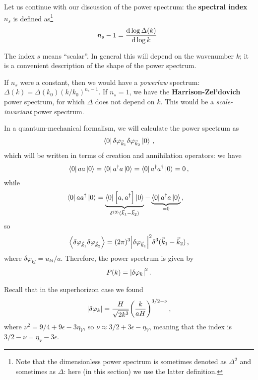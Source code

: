 \documentclass[main.tex]{subfiles}
\begin{document}
Let us continue with our discussion of the power spectrum: the \textbf{spectral index} \(n_s\) is defined as\footnote{Note that the dimensionless power spectrum is sometimes denoted as \(\Delta^2\) and sometimes as \(\Delta \): here (in this section) we use the latter definition.}
%
\begin{align}
n_s - 1 = \dv{\log \Delta (k)}{\log k}
\,.
\end{align}

The index \(s\) means ``scalar''. 
In general this will depend on the wavenumber \(k\); it is a convenient description of the shape of the power spectrum. 

If \(n_s\) were a constant, then we would have a \emph{powerlaw} spectrum: \(\Delta (k) = \Delta (k_0 ) (k / k_0 )^{n_s - 1}\). 
If \(n_s = 1\), we have the \textbf{Harrison-Zel'dovich} power spectrum, for which \(\Delta \) does not depend on \(k\).
This would be a \emph{scale-invariant} power spectrum.

In a quantum-mechanical formalism, we will calculate the power spectrum as 
%
\begin{align}
\bra{0} \delta \varphi _{\vec{k}_1} \delta \varphi _{\vec{k}_2} \ket{0}
\,,
\end{align}
%
which will be written in terms of creation and annihilation operators: we have 
%
\begin{align}
\bra{0} a a \ket{0}=
\bra{0} a ^\dag a  \ket{0}=
\bra{0} a ^\dag a ^\dag \ket{0}= 0
\,,
\end{align}
%
while 
%
\begin{align}
\bra{0} a a ^\dag \ket{0} &= \underbrace{\bra{0} \qty[a, a ^\dag] \ket{0}}_{ \delta^{(3)} (\vec{k}_1 - \vec{k}_2)} - \underbrace{\bra{0} a ^\dag a \ket{0}}_{= 0} 
\,,
\end{align}
%
so 
%
\begin{align}
\expval{ \delta \varphi _{\vec{k}_1} \delta \varphi _{\vec{k}_2}} = (2 \pi )^3 \abs{ \delta \varphi _{\vec{k}_1}}^2 \delta^3(\vec{k}_1 - \vec{k}_2)
\,,
\end{align}
%
where \(\delta \varphi _{kl} = u_{kl} / a\). 
Therefore, the power spectrum is given by 
%
\begin{align}
P(k) = \abs{ \delta \varphi _k}^2
\,.
\end{align}

Recall that in the superhorizon case we found 
%
\begin{align}
\abs{ \delta \varphi _k} = \frac{H}{\sqrt{2 k^3}} \qty( \frac{k}{aH})^{3/2 - \nu }
\,,
\end{align}
%
where \(\nu^2 = 9/4 + 9 \epsilon - 3 \eta _V\), so \(\nu \approx 3/2 + 3\epsilon - \eta _V \), meaning that the index is \(3/2 - \nu = \eta _V - 3 \epsilon \). 
\end{document}
